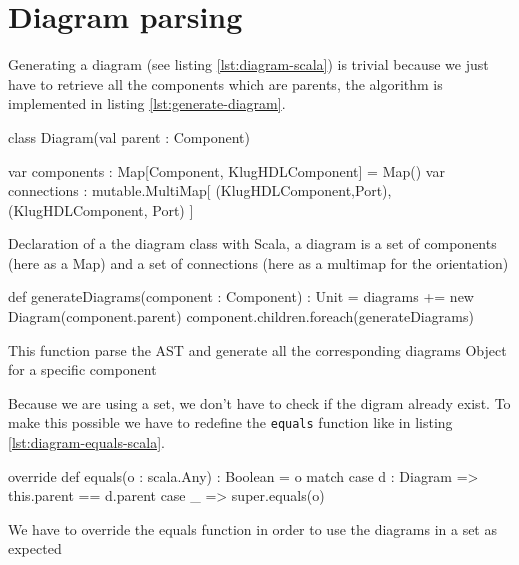 \section{Diagram parsing}
\label{sec:diagrams-parsing}

Generating a diagram (see listing \ref{lst:diagram-scala}) is trivial because we
just have to retrieve all the components which are parents, the algorithm is
implemented in listing \ref{lst:generate-diagram}. 
\begin{listing}[H]
  \centering
  \begin{scalacode}
    class Diagram(val parent : Component) {

      var components : Map[Component, KlugHDLComponent] = Map()
      var connections : mutable.MultiMap[
          (KlugHDLComponent,Port),
          (KlugHDLComponent, Port)
        ]
      }
  \end{scalacode}
  \caption[Diagram class declaration]{Declaration of a the diagram class with
    Scala, a diagram is a set of components (here as a Map) and a set of
    connections (here as a multimap for the orientation)}
  \label{lst:diagram-scala}
\end{listing}

\begin{listing}[H]
  \centering
  \begin{scalacode}
  def generateDiagrams(component : Component) : Unit = {
    diagrams += new Diagram(component.parent)
    component.children.foreach(generateDiagrams)
  }
  \end{scalacode}
  \caption[Parsing the diagrams form the AST]{This function parse the AST and
    generate all the corresponding diagrams Object for a specific component}
  \label{lst:generate-diagram}
\end{listing}

Because we are using a set,
we don't have to check if the digram already exist. To make this possible we
have to redefine the \verb|equals| function like in listing \ref{lst:diagram-equals-scala}.

\begin{listing}[H]
  \centering
  \begin{scalacode}
  override def equals(o : scala.Any) : Boolean = o match {
    case d : Diagram => this.parent == d.parent
    case _ => super.equals(o)
  }
  \end{scalacode}
  \caption[Equals function implementation for the Diagram Class]{We have to
    override the equals function in order to use the diagrams in a set as expected}
  \label{lst:diagram-equals-scala}
\end{listing}

